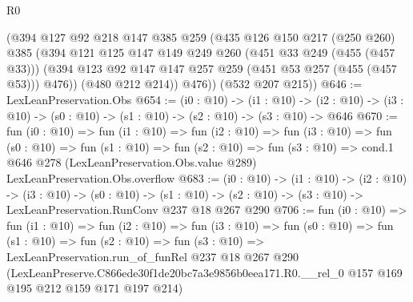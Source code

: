 \begin{lexlean}{R0}
\begin{coremodule}
        (@394
          @127
          @92
          @218
          @147
          @385
          @259
          (@435
            @126
            @150
            @217
            (@250 @260)
            @385
            (@394
              @121
              @125
              @147
              @149
              @249
              @260
              (@451 @33 @249 (@455 (@457 @33)))
              (@394 @123 @92 @147 @147 @257 @259 (@451 @53 @257 (@455 (@457 @53))) @476))
            (@480 @212 @214))
          @476))
      (@532 @207 @215))
@646 := LexLeanPreservation.Obs
@654 := (i0 : @10) ->
  (i1 : @10) ->
  (i2 : @10) -> (i3 : @10) -> (s0 : @10) -> (s1 : @10) -> (s2 : @10) -> (s3 : @10) -> @646
@670 := fun (i0 : @10) =>
  fun (i1 : @10) =>
  fun (i2 : @10) =>
  fun (i3 : @10) =>
  fun (s0 : @10) =>
  fun (s1 : @10) =>
  fun (s2 : @10) =>
  fun (s3 : @10) =>
  cond.{1} @646 @278 (LexLeanPreservation.Obs.value @289) LexLeanPreservation.Obs.overflow
@683 := (i0 : @10) ->
  (i1 : @10) ->
  (i2 : @10) ->
  (i3 : @10) ->
  (s0 : @10) ->
  (s1 : @10) -> (s2 : @10) -> (s3 : @10) -> LexLeanPreservation.RunConv @237 @18 @267 @290
@706 := fun (i0 : @10) =>
  fun (i1 : @10) =>
  fun (i2 : @10) =>
  fun (i3 : @10) =>
  fun (s0 : @10) =>
  fun (s1 : @10) =>
  fun (s2 : @10) =>
  fun (s3 : @10) =>
  LexLeanPreservation.run_of_funRel
    @237
    @18
    @267
    @290
    (LexLeanPreserve.C866ede30f1de20bc7a3e9856b0eea171.R0.__rel_0
      @157
      @169
      @195
      @212
      @159
      @171
      @197
      @214)
\end{coremodule}
\end{lexlean}
